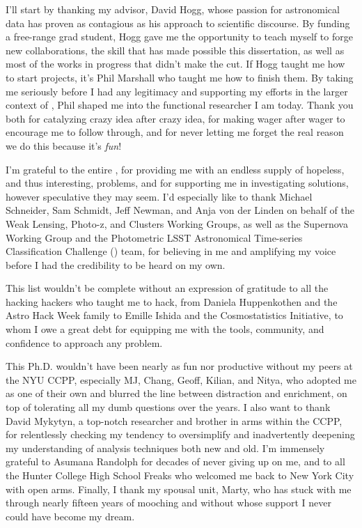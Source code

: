 I'll start by thanking my advisor, David Hogg, whose passion for astronomical data has proven as contagious as his approach to scientific discourse.
By funding a free-range grad student, Hogg gave me the opportunity to teach myself to forge new collaborations, the skill that has made possible this dissertation, as well as most of the works in progress that didn't make the cut.
If Hogg taught me how to start projects, it's Phil Marshall who taught me how to finish them.
By taking me seriously before I had any legitimacy and supporting my efforts in the larger context of \desc, Phil shaped me into the functional researcher I am today.
Thank you both for catalyzing crazy idea after crazy idea, for making wager after wager to encourage me to follow through, and for never letting me forget the real reason we do this \textemdash because it's \textit{fun}!

I'm grateful to the entire \desc, for providing me with an endless supply of hopeless, and thus interesting, problems, and for supporting me in investigating solutions, however speculative they may seem. 
I'd especially like to thank Michael Schneider, Sam Schmidt, Jeff Newman, and Anja von der Linden on behalf of the Weak Lensing, Photo-z, and Clusters Working Groups, as well as the Supernova Working Group and the Photometric LSST Astronomical Time-series Classification Challenge () team, for believing in me and amplifying my voice before I had the credibility to be heard on my own.

This list wouldn't be complete without an expression of gratitude to all the hacking hackers who taught me to hack, from Daniela Huppenkothen and the Astro Hack Week family to Emille Ishida and the Cosmostatistics Initiative, to whom I owe a great debt for equipping me with the tools, community, and confidence to approach any problem.


This Ph.D. wouldn't have been nearly as fun nor productive without my peers at the NYU CCPP, especially MJ, Chang, Geoff, Kilian, and Nitya, who adopted me as one of their own and blurred the line between distraction and enrichment, on top of tolerating all my dumb questions over the years.
I also want to thank David Mykytyn, a top-notch researcher and brother in arms within the CCPP, for relentlessly checking my tendency to oversimplify and inadvertently deepening my understanding of analysis techniques both new and old.
I'm immensely grateful to Asumana Randolph for decades of never giving up on me, and to all the Hunter College High School Freaks who welcomed me back to New York City with open arms.
Finally, I thank my spousal unit, Marty, who has stuck with me through nearly fifteen years of mooching and without whose support I never could have become my dream.